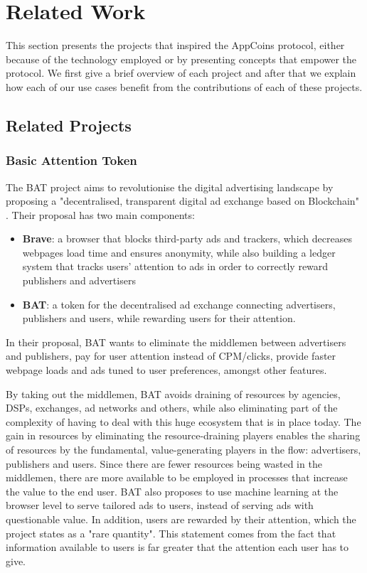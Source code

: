 \section{Related Work}

\label{sec:related}

This section presents the projects that inspired the AppCoins protocol, either because of the technology employed or by presenting concepts that empower the protocol. We first give a brief overview of each project and after that we explain how each of our use cases benefit from the contributions of each of these projects.

\subsection{Related Projects}

\subsubsection{Basic Attention Token}

The BAT project aims to revolutionise the digital advertising landscape by proposing a "decentralised, transparent digital ad exchange based on Blockchain" \cite{BAT}. Their proposal has two main components:

\begin{itemize}
	\item {\bf Brave}: a browser that blocks third-party ads and trackers, which decreases webpages load time and ensures anonymity, while also building a ledger system that tracks users' attention to ads in order to correctly reward publishers and advertisers
	\item {\bf BAT}: a token for the decentralised ad exchange connecting advertisers, publishers and users, while rewarding users for their attention.
\end{itemize}

In their proposal, BAT wants to eliminate the middlemen between advertisers and publishers, pay for user attention instead of CPM/clicks, provide faster webpage loads and ads tuned to user preferences, amongst other features.

\medskip

By taking out the middlemen, BAT avoids draining of resources by agencies, DSPs, exchanges, ad networks and others, while also eliminating part of the complexity of having to deal with this huge ecosystem that is in place today. The gain in resources by eliminating the resource-draining players enables the sharing of resources by the fundamental, value-generating  players in the flow: advertisers, publishers and users. Since there are fewer resources being wasted in the middlemen, there are more available to be employed in processes that increase the value to the end user. BAT also proposes to use machine learning at the browser level to serve tailored ads to users, instead of serving ads with questionable value. In addition, users are rewarded by their attention, which the project states as a "rare quantity". This statement comes from the fact that information available to users is far greater that the attention each user has to give.

